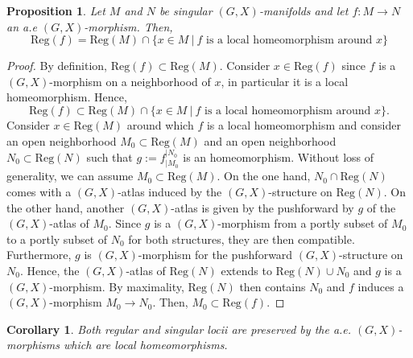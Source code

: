 \documentclass[a4paper,12pt]{article}
\newtheorem{prop}[lem]{Proposition}
\newtheorem{cor}[lem]{Corollary}
\def\Reg{\mathrm{Reg}}
\def\reg{\Reg}
\def\reg{\mathrm{Reg}}
\def\Reg{\mathrm{Reg}}
\begin{document}
					
                \begin{prop}{}\label{prop:GX_sing_homeo_reg}
						 Let $M$ and $N$ be singular $(G,X)$-manifolds and let $f:M\rightarrow N$ an a.e $(G,X)$-morphism. Then,					
					$$\reg(f)=\reg(M)\cap \{x\in M  ~|~ f \text{ is a local homeomorphism around }x\}$$
					\end{prop}
					\begin{proof}
					By definition, $\reg(f)\subset \reg(M)$.
					Consider $x\in \reg(f)$  since $f$ is a $(G,X)$-morphism on a neighborhood of $x$, in particular it is a local homeomorphism. 
					Hence, $$\reg(f)\subset\reg(M)\cap \{x\in M  ~|~ f \text{ is a local homeomorphism around }x\}.$$
					Consider $x\in \reg(M)$ around which $f$ is a local homeomorphism and consider an open neighborhood $M_0\subset \reg(M)$ and an open neighborhood $N_0\subset \reg(N)$ such that $g:=f_{|M_0}^{|N_0}$ is an homeomorphism. Without loss of generality, we can assume $M_0\subset \reg(M)$.
					On the one hand, $N_0\cap \reg(N)$ comes with a  $(G,X)$-atlas induced by the $(G,X)$-structure on $\reg(N)$. On the other hand, another $(G,X)$-atlas is given by the pushforward by $g$ of the $(G,X)$-atlas of $M_0$.  
					Since $g$ is a $(G,X)$-morphism from a portly subset of $M_0$ to a portly subset of $N_0$ for both structures, they are then compatible. Furthermore, $g$ is $(G,X)$-morphism for the pushforward $(G,X)$-structure on $N_0$. Hence, the $(G,X)$-atlas of $\reg(N)$ extends to $\reg(N)\cup N_0$ and $g$ is a $(G,X)$-morphism. By maximality, $\reg(N)$ then contains $N_0$ and $f$ induces a $(G,X)$-morphism $M_0\rightarrow N_0$. Then, $M_0\subset \reg(f)$.
					\end{proof}


					\begin{cor}\label{cor:both_regular_singular_locii}
					   Both regular and singular locii are preserved by the a.e. $(G,X)$-morphisms which are local homeomorphisms.
					\end{cor}
					
\end{document}
